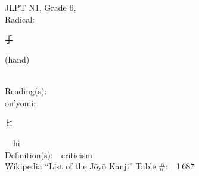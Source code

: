 \begin{multicols}{2}
\ \ \\
{\fontsize{34pt}{40pt}  }\ \ \\  %
{JLPT N1, Grade 6, \\Radical:\ \ {\begin{CJK}{UTF8}{min} 手 \end{CJK}} (hand) } \\
Reading(s):\ \ \\
{\hspace*{1em}}on'yomi:\ \ \\
{\hspace*{2em}}{\begin{CJK}{UTF8}{min} ヒ \end{CJK}}\ \ hi\ \ \\
Definition(s):\ \ criticism \\
Wikipedia ``List of the J\=oy\=o Kanji'' Table \#:\ \ 1\,687 \\
\ \ \\
\end{multicols}



